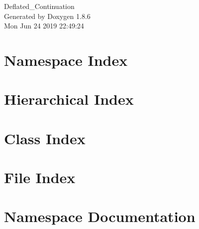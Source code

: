 \documentclass[twoside]{book}
\newcommand{\clearemptydoublepage}{%
  \newpage{\pagestyle{empty}\cleardoublepage}%
}
\begin{document}
\hypersetup{pageanchor=false}
\begin{titlepage}
\vspace*{7cm}
\begin{center}%
{\Large Deflated\-\_\-\-Continuation }\\
\vspace*{1cm}
{\large Generated by Doxygen 1.8.6}\\
\vspace*{0.5cm}
{\small Mon Jun 24 2019 22:49:24}\\
\end{center}
\end{titlepage}
\clearemptydoublepage
\tableofcontents
\clearemptydoublepage
{}
\hypersetup{pageanchor=true}

\chapter{Namespace Index}

\chapter{Hierarchical Index}

\chapter{Class Index}

\chapter{File Index}

\chapter{Namespace Documentation}






















\end{document}
